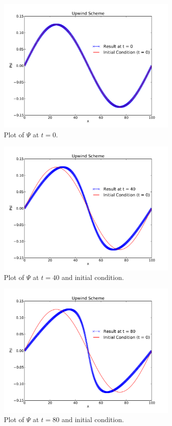 \documentclass[11pt,letterpaper]{article}
\begin{document}
\begin{figure}[bth]
\centering
\includegraphics[width=0.80\textwidth]{t=0.pdf}
\caption{Plot of $\Psi$ at $t = 0$.}
\label{fig:t=0}
\end{figure}

\begin{figure}[bth]
\centering
\includegraphics[width=0.80\textwidth]{t=40.pdf}
\caption{Plot of $\Psi$ at $t = 40$ and initial condition.}
\label{fig:t=40}
\end{figure}

\begin{figure}[bth]
\centering
\includegraphics[width=0.80\textwidth]{t=80.pdf}
\caption{Plot of $\Psi$ at $t = 80$ and initial condition.}
\label{fig:t=80}
\end{figure}
\end{document}
